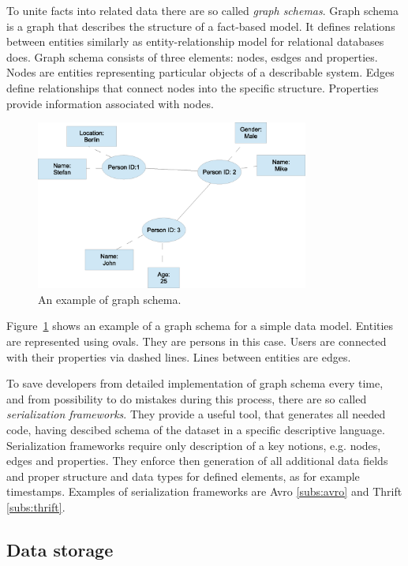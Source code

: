 To unite facts into related data there are so called \textit{graph schemas}.
Graph schema is a graph that describes the structure of a fact-based model.
It defines relations between entities similarly as entity-relationship model for relational databases does.
Graph schema consists of three elements: nodes, esdges and properties.
Nodes are entities representing particular objects of a describable system.
Edges define relationships that connect nodes into the specific structure.
Properties provide information associated with nodes.

\begin{figure}[h]
  \centering
  \includegraphics [width=0.8\textwidth]{images/GraphSchema}
  \caption{An example of graph schema.}
  \label{fig:GraphSchema}
\end{figure}

Figure~\ref{fig:GraphSchema} shows an example of a graph schema for a simple data model.
Entities are represented using ovals.
They are persons in this case.
Users are connected with their properties via dashed lines.
Lines between entities are edges.

To save developers from detailed implementation of graph schema every time, and from possibility to do mistakes during this process, there are so called \textit{serialization frameworks}.
They provide a useful tool, that generates all needed code, having descibed schema of the dataset in a specific descriptive language.
Serialization frameworks require only description of a key notions, e.g. nodes, edges and properties.
They enforce then generation of all additional data fields and proper structure and data types for defined elements, as for example timestamps.  
Examples of serialization frameworks are Avro \ref{subs:avro} and Thrift \ref{subs:thrift}.

\subsection{Data storage}

